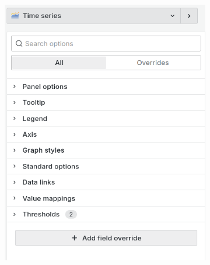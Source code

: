 \begin{figure}[h]
    \centering
    \begin{subfigure}{0.45\textwidth}
        \centering
        \includegraphics[width=\linewidth]{figures/grafana-panel-customization}
        \label{fig:figure1}
    \end{subfigure}
    \hspace{0.05\textwidth}
    \begin{subfigure}{0.45\textwidth}
        \centering

\end{subfigure}
\end{figure}

